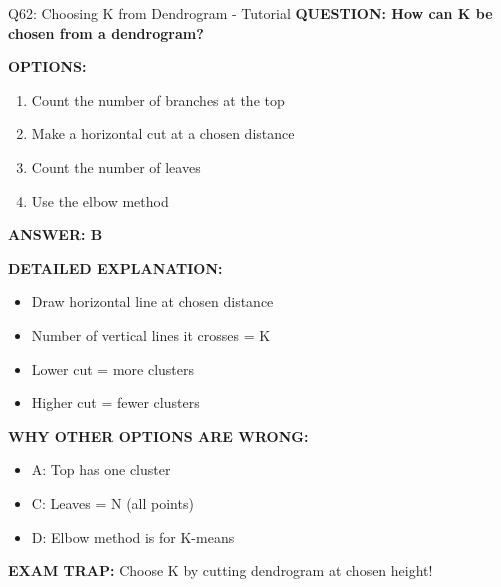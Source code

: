 \documentclass[8pt]{beamer}
\begin{document}
	\begin{frame}{Q62: Choosing K from Dendrogram - Tutorial}
		\fontsize{6.5}{7.5}\selectfont
		\textbf{QUESTION: How can K be chosen from a dendrogram?}
		
		\vspace{0.1cm}
		\textbf{OPTIONS:}
		\begin{enumerate}
			\item Count the number of branches at the top
			\item Make a horizontal cut at a chosen distance
			\item Count the number of leaves
			\item Use the elbow method
		\end{enumerate}
		
		\vspace{0.1cm}
		\textcolor{myblue}{\textbf{ANSWER: B}}
		
		\vspace{0.1cm}
		\textbf{DETAILED EXPLANATION:}
		\begin{itemize}
			\item Draw horizontal line at chosen distance
			\item Number of vertical lines it crosses = K
			\item Lower cut = more clusters
			\item Higher cut = fewer clusters
		\end{itemize}
		
		\vspace{0.1cm}
		\textcolor{myred}{\textbf{WHY OTHER OPTIONS ARE WRONG:}}
		\begin{itemize}
			\item \textcolor{myred}{A:} Top has one cluster
			\item \textcolor{myred}{C:} Leaves = N (all points)
			\item \textcolor{myred}{D:} Elbow method is for K-means
		\end{itemize}
		
		\textcolor{myred}{\textbf{EXAM TRAP:}} Choose K by \textcolor{myblue}{cutting dendrogram at chosen height}!
	\end{frame}
	
\end{document}
